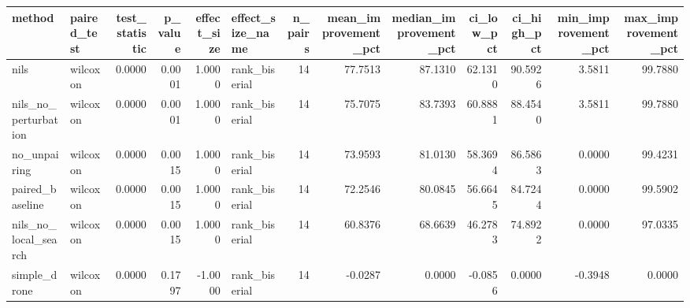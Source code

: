 \begin{tabular}{llrrrlrrrrrrr}
\toprule
method & paired_test & test_statistic & p_value & effect_size & effect_size_name & n_pairs & mean_improvement_pct & median_improvement_pct & ci_low_pct & ci_high_pct & min_improvement_pct & max_improvement_pct \\
\midrule
nils & wilcoxon & 0.0000 & 0.0001 & 1.0000 & rank_biserial & 14 & 77.7513 & 87.1310 & 62.1310 & 90.5926 & 3.5811 & 99.7880 \\
nils_no_perturbation & wilcoxon & 0.0000 & 0.0001 & 1.0000 & rank_biserial & 14 & 75.7075 & 83.7393 & 60.8881 & 88.4540 & 3.5811 & 99.7880 \\
no_unpairing & wilcoxon & 0.0000 & 0.0015 & 1.0000 & rank_biserial & 14 & 73.9593 & 81.0130 & 58.3694 & 86.5863 & 0.0000 & 99.4231 \\
paired_baseline & wilcoxon & 0.0000 & 0.0015 & 1.0000 & rank_biserial & 14 & 72.2546 & 80.0845 & 56.6645 & 84.7244 & 0.0000 & 99.5902 \\
nils_no_local_search & wilcoxon & 0.0000 & 0.0015 & 1.0000 & rank_biserial & 14 & 60.8376 & 68.6639 & 46.2783 & 74.8922 & 0.0000 & 97.0335 \\
simple_drone & wilcoxon & 0.0000 & 0.1797 & -1.0000 & rank_biserial & 14 & -0.0287 & 0.0000 & -0.0856 & 0.0000 & -0.3948 & 0.0000 \\
\bottomrule
\end{tabular}
